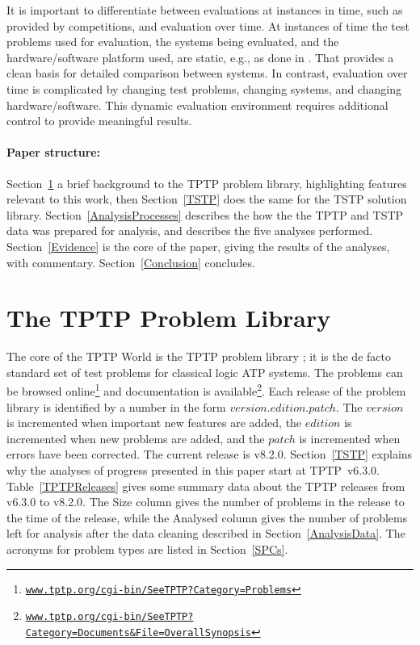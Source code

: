 \documentclass[runningheads]{llncs}
\begin{document}
It is important to differentiate between evaluations at instances in time, such as provided by
competitions, and evaluation over time.
At instances of time the test problems used for evaluation, the systems being evaluated, and
the hardware/software platform used, are static, e.g., as done in \cite{CSW15}.
That provides a clean basis for detailed comparison between systems.
In contrast, evaluation over time is complicated by changing test problems, changing systems,
and changing hardware/software.
This dynamic evaluation environment requires additional control to provide meaningful results.

\paragraph{Paper structure:}
Section~\ref{TPTP} a brief background to the TPTP problem library, highlighting features relevant
to this work, then Section~\ref{TSTP} does the same for the TSTP solution library.
Section~\ref{AnalysisProcesses} describes the how the the TPTP and TSTP data was prepared for
analysis, and describes the five analyses performed.
Section~\ref{Evidence} is the core of the paper, giving the results of the analyses, with 
commentary.
Section~\ref{Conclusion} concludes.

\section{The TPTP Problem Library}
\label{TPTP}

The core of the TPTP World is the TPTP problem library \cite{Sut09}; it is the de facto standard 
set of test problems for classical logic ATP systems.
The problems can be browsed online\footnote{%
\href{https://www.tptp.org/cgi-bin/SeeTPTP?Category=Problems}
{\tt www.tptp.org/cgi-bin/SeeTPTP?Category=Problems}}
and documentation is available\footnote{%
\href{https://www.tptp.org/cgi-bin/SeeTPTP?Category=Documents}
{\tt www.tptp.org/cgi-bin/SeeTPTP?Category=Documents\&File=OverallSynopsis}}.
Each release of the problem library is identified by a number in the form 
$version$.$edition$.$patch$.
The $version$ is incremented when important new features are added,
the $edition$ is incremented when new problems are added, and
the $patch$ is incremented when errors have been corrected.
The current release is v8.2.0.
Section~\ref{TSTP} explains why the analyses of progress presented in this paper start at
TPTP~v6.3.0.
Table~\ref{TPTPReleases} gives some summary data about the TPTP releases from v6.3.0 to v8.2.0.
The Size column gives the number of problems in the release to the time of the release, while
the Analysed column gives the number of problems left for analysis after the data cleaning 
described in Section~\ref{AnalysisData}.
The acronyms for problem types are listed in Section~\ref{SPCs}.
\end{document}
